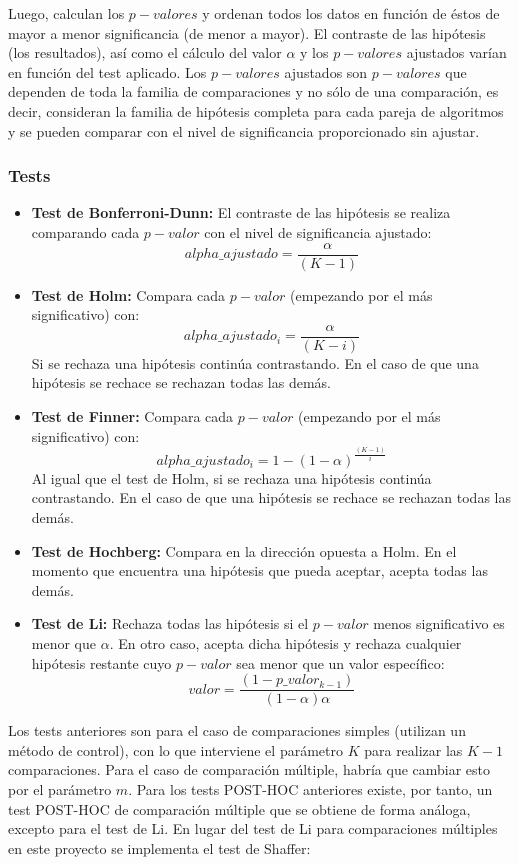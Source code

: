 Luego, calculan los $p-valores$ y ordenan todos los datos en función de éstos de mayor a menor significancia (de
menor a mayor). El contraste de las hipótesis (los resultados), así como el cálculo del valor $\alpha$ y los
$p-valores$ ajustados varían en función del test aplicado. Los $p-valores$ ajustados son $p-valores$ que dependen
de toda la familia de comparaciones y no sólo de una comparación, es decir, consideran la familia de hipótesis
completa para cada pareja de algoritmos y se pueden comparar con el nivel de significancia proporcionado sin
ajustar.

\subsubsection{Tests}
\begin{itemize}
\item \textbf{Test de Bonferroni-Dunn:} El contraste de las hipótesis se realiza comparando cada $p-valor$ con
el nivel de significancia ajustado:
\[ alpha\_ajustado = \frac{\alpha}{(K-1)} \]
\item \textbf{Test de Holm:} Compara cada $p-valor$ (empezando por el más significativo) con:
\[ alpha\_ajustado_i = \frac{\alpha}{(K-i)} \]
Si se rechaza una hipótesis continúa contrastando. En el caso de que una hipótesis se rechace se rechazan todas
las demás.
\item \textbf{Test de Finner:} Compara cada $p-valor$ (empezando por el más significativo) con:
\[ alpha\_ajustado_i = 1-(1-\alpha)^{\frac{(K-1)}{i}} \]
Al igual que el test de Holm, si se rechaza una hipótesis continúa contrastando. En el caso de que una hipótesis
se rechace se rechazan todas
las demás.
\item \textbf{Test de Hochberg:} Compara en la dirección opuesta a Holm. En el momento que encuentra una hipótesis
que pueda aceptar, acepta todas las demás.
\item \textbf{Test de Li:} Rechaza todas las hipótesis si el $p-valor$ menos significativo es menor que  $\alpha$.
En otro caso, acepta dicha hipótesis y rechaza cualquier hipótesis restante cuyo $p-valor$ sea menor que un valor
específico:
\[ valor = \frac{(1-p\_valor_{k-1})}{(1-\alpha)\alpha} \]
\end{itemize}

Los tests anteriores son para el caso de comparaciones simples (utilizan un método de control), con lo que
interviene el parámetro $K$ para realizar las $K-1$ comparaciones. Para el caso de comparación múltiple, habría
que cambiar esto por el parámetro $m$. Para los tests POST-HOC anteriores existe, por tanto, un test POST-HOC
de comparación múltiple que se obtiene de forma análoga, excepto para el test de Li. En lugar del test de Li
para comparaciones múltiples en este proyecto se implementa el test de Shaffer:

